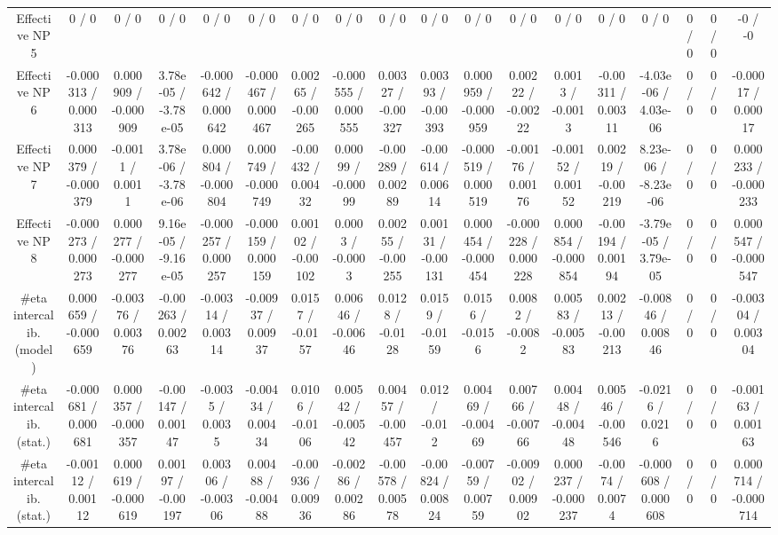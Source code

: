 \documentclass[10pt]{article}
\begin{document}
\begin{table}[htbp]
\begin{center}
\begin{tabular}{|c|c|c|c|c|c|c|c|c|c|c|c|c|c|c|c|c|c|}
  Effective NP 5 & 0 / 0 & 0 / 0 & 0 / 0 & 0 / 0 & 0 / 0 & 0 / 0 & 0 / 0 & 0 / 0 & 0 / 0 & 0 / 0 & 0 / 0 & 0 / 0 & 0 / 0 & 0 / 0 & 0 / 0 & 0 / 0 & -0 / -0 \\ 
  Effective NP 6 & -0.000313 / 0.000313 & 0.000909 / -0.000909 & 3.78e-05 / -3.78e-05 & -0.000642 / 0.000642 & -0.000467 / 0.000467 & 0.00265 / -0.00265 & -0.000555 / 0.000555 & 0.00327 / -0.00327 & 0.00393 / -0.00393 & 0.000959 / -0.000959 & 0.00222 / -0.00222 & 0.0013 / -0.0013 & -0.00311 / 0.00311 & -4.03e-06 / 4.03e-06 & 0 / 0 & 0 / 0 & -0.00017 / 0.00017 \\ 
  Effective NP 7 & 0.000379 / -0.000379 & -0.0011 / 0.0011 & 3.78e-06 / -3.78e-06 & 0.000804 / -0.000804 & 0.000749 / -0.000749 & -0.00432 / 0.00432 & 0.00099 / -0.00099 & -0.00289 / 0.00289 & -0.00614 / 0.00614 & -0.000519 / 0.000519 & -0.00176 / 0.00176 & -0.00152 / 0.00152 & 0.00219 / -0.00219 & 8.23e-06 / -8.23e-06 & 0 / 0 & 0 / 0 & 0.000233 / -0.000233 \\ 
  Effective NP 8 & -0.000273 / 0.000273 & 0.000277 / -0.000277 & 9.16e-05 / -9.16e-05 & -0.000257 / 0.000257 & -0.000159 / 0.000159 & 0.00102 / -0.00102 & 0.0003 / -0.0003 & 0.00255 / -0.00255 & 0.00131 / -0.00131 & 0.000454 / -0.000454 & -0.000228 / 0.000228 & 0.000854 / -0.000854 & -0.00194 / 0.00194 & -3.79e-05 / 3.79e-05 & 0 / 0 & 0 / 0 & 0.000547 / -0.000547 \\ 
  #eta intercalib. (model) & 0.000659 / -0.000659 & -0.00376 / 0.00376 & -0.00263 / 0.00263 & -0.00314 / 0.00314 & -0.00937 / 0.00937 & 0.0157 / -0.0157 & 0.00646 / -0.00646 & 0.0128 / -0.0128 & 0.0159 / -0.0159 & 0.0156 / -0.0156 & 0.0082 / -0.0082 & 0.00583 / -0.00583 & 0.00213 / -0.00213 & -0.00846 / 0.00846 & 0 / 0 & 0 / 0 & -0.00304 / 0.00304 \\ 
  #eta intercalib. (stat.) & -0.000681 / 0.000681 & 0.000357 / -0.000357 & -0.00147 / 0.00147 & -0.0035 / 0.0035 & -0.00434 / 0.00434 & 0.0106 / -0.0106 & 0.00542 / -0.00542 & 0.00457 / -0.00457 & 0.012 / -0.012 & 0.00469 / -0.00469 & 0.00766 / -0.00766 & 0.00448 / -0.00448 & 0.00546 / -0.00546 & -0.0216 / 0.0216 & 0 / 0 & 0 / 0 & -0.00163 / 0.00163 \\ 
  #eta intercalib. (stat.) & -0.00112 / 0.00112 & 0.000619 / -0.000619 & 0.00197 / -0.00197 & 0.00306 / -0.00306 & 0.00488 / -0.00488 & -0.00936 / 0.00936 & -0.00286 / 0.00286 & -0.00578 / 0.00578 & -0.00824 / 0.00824 & -0.00759 / 0.00759 & -0.00902 / 0.00902 & 0.000237 / -0.000237 & -0.0074 / 0.0074 & -0.000608 / 0.000608 & 0 / 0 & 0 / 0 & 0.000714 / -0.000714 \\ 

\end{tabular}
\end{center}
\end{table}
\end{document}
